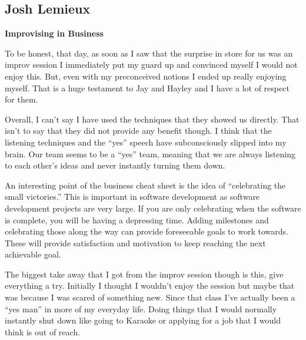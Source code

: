 \documentclass[12pt,letterpaper]{article}
\begin{document}
\subsection{Josh Lemieux}
\textbf{Improvising in Business}\par
To be honest, that day, as soon as I saw that the surprise in store for us was an improv session I immediately put my guard up and convinced myself I would not enjoy this. But, even with my preconceived notions I ended up really enjoying myself. That is a huge testament to Jay and Hayley and I have a lot of respect for them.\par
      	Overall, I can’t say I have used the techniques that they showed us directly. That isn’t to say that they did not provide any benefit though. I think that the listening techniques and the “yes” speech have subconsciously slipped into my brain. Our team seems to be a “yes” team, meaning that we are always listening to each other’s ideas and never instantly turning them down.\par
      	An interesting point of the business cheat sheet is the idea of “celebrating the small victories.” This is important in software development as software development projects are very large. If you are only celebrating when the software is complete, you will be having a depressing time. Adding milestones and celebrating those along the way can provide foreseeable goals to work towards. These will provide satisfaction and motivation to keep reaching the next achievable goal.\par
      	The biggest take away that I got from the improv session though is this, give everything a try. Initially I thought I wouldn’t enjoy the session but maybe that was because I was scared of something new. Since that class I’ve actually been a “yes man” in more of my everyday life. Doing things that I would normally instantly shut down like going to Karaoke or applying for a job that I would think is out of reach.

\clearpage
\end{document}
